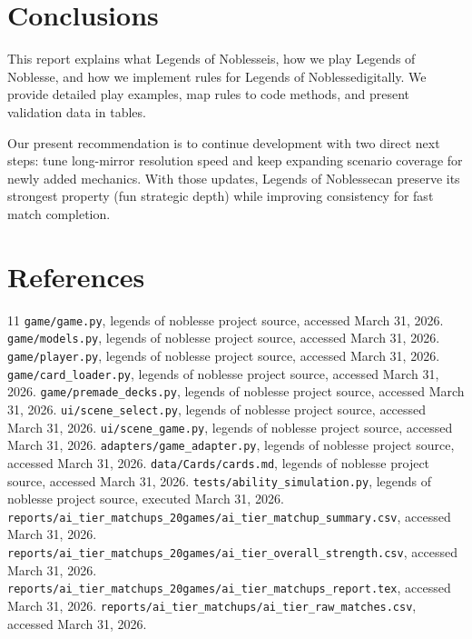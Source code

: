 \documentclass[12pt]{article}
\newcommand{\GameName}{Legends of Noblesse}
\begin{document}
\section{Conclusions}
This report explains what \GameName is, how we play \GameName, and how we implement rules for \GameName digitally. We provide detailed play examples, map rules to code methods, and present validation data in tables.

Our present recommendation is to continue development with two direct next steps: tune long-mirror resolution speed and keep expanding scenario coverage for newly added mechanics. With those updates, \GameName can preserve its strongest property (fun strategic depth) while improving consistency for fast match completion.

\newpage
\section{References}
\begin{thebibliography}{11}
 \texttt{game/game.py}, legends of noblesse project source, accessed March 31, 2026.
 \texttt{game/models.py}, legends of noblesse project source, accessed March 31, 2026.
 \texttt{game/player.py}, legends of noblesse project source, accessed March 31, 2026.
 \texttt{game/card\_loader.py}, legends of noblesse project source, accessed March 31, 2026.
 \texttt{game/premade\_decks.py}, legends of noblesse project source, accessed March 31, 2026.
 \texttt{ui/scene\_select.py}, legends of noblesse project source, accessed March 31, 2026.
 \texttt{ui/scene\_game.py}, legends of noblesse project source, accessed March 31, 2026.
 \texttt{adapters/game\_adapter.py}, legends of noblesse project source, accessed March 31, 2026.
 \texttt{data/Cards/cards.md}, legends of noblesse project source, accessed March 31, 2026.
 \texttt{tests/ability\_simulation.py}, legends of noblesse project source, executed March 31, 2026.
 \texttt{reports/ai\_tier\_matchups\_20games/ai\_tier\_matchup\_summary.csv}, accessed March 31, 2026.
 \texttt{reports/ai\_tier\_matchups\_20games/ai\_tier\_overall\_strength.csv}, accessed March 31, 2026.
 \texttt{reports/ai\_tier\_matchups\_20games/ai\_tier\_matchups\_report.tex}, accessed March 31, 2026.
 \texttt{reports/ai\_tier\_matchups/ai\_tier\_raw\_matches.csv}, accessed March 31, 2026.
\end{thebibliography}
\end{document}
